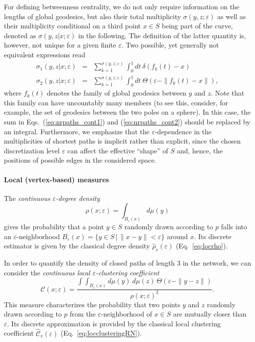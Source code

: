 For defining betweenness centrality, we do not only require information on the lengths of global geodesics, but also their total multiplicity $\sigma(y,z;\varepsilon)$ as well as their multiplicity conditional on a third point $x\in S$ being part of the curve, denoted as $\sigma(y,z|x;\varepsilon)$ in the following. The definition of the latter quantity is, however, not unique for a given finite $\varepsilon$. Two possible, yet generally not equivalent expressions read~\cite{Donges2012}
\begin{eqnarray}
\sigma_1(y,z|x;\varepsilon) &=& \sum_{k=1}^{\sigma(y,z;\varepsilon)} \int_0^1 dt\ \delta(f_k(t)-x) \label{eq:nrpaths_cont1} \\
\sigma_2(y,z|x;\varepsilon) &=& \sum_{k=1}^{\sigma(y,z;\varepsilon)} \int_0^1 dt\ \Theta(\varepsilon-\|f_k(t)-x\|), \label{eq:nrpaths_cont2}
\end{eqnarray}
\noindent
where $f_k(t)$ denotes the family of global geodesics between $y$ and $z$. Note that this family can have uncountably many members (to see this, consider, for example, the set of geodesics between the two poles on a sphere). In this case, the sum in Eqs.~(\ref{eq:nrpaths_cont1}) and (\ref{eq:nrpaths_cont2}) should be replaced by an integral. Furthermore, we emphasize that the $\varepsilon$-dependence in the multiplicities of shortest paths is implicit rather than explicit, since the chosen discretization level $\varepsilon$ can affect the effective ``shape'' of $S$ and, hence, the positions of possible edges in the considered space.


\paragraph{Local (vertex-based) measures}

The \emph{continuous $\varepsilon$-degree density}
\begin{equation}
\rho(x;\varepsilon)=\int_{B_{\varepsilon}(x)} d\mu(y)
\end{equation}
\noindent
gives the probability that a point $y\in S$ randomly drawn according to $p$ falls into an $\varepsilon$-neighborhood $B_{\varepsilon}(x)=\{y\in S\,|\, \|x-y\|<\varepsilon\}$ around $x$. Its discrete estimator is given by the classical degree density $\hat{\rho}_v(\varepsilon)$ (Eq.~\ref{eq:locrho}).

In order to quantify the density of closed paths of length 3 in the network, we can consider the \emph{continuous local $\varepsilon$-clustering coefficient}
\begin{equation}
\mathcal{C}(x;\varepsilon)=\frac{\int\int_{B_{\varepsilon}(x)} d\mu(y)\ d\mu(z)\ \Theta(\varepsilon-\|y-z\|)}{\rho(x;\varepsilon)^2}.
\end{equation}
\noindent
This measure characterizes the probability that two points $y$ and $z$ randomly drawn according to $p$ from the $\varepsilon$-neighborhood of $x\in S$ are mutually closer than $\varepsilon$. Its discrete approximation is provided by the classical local clustering coefficient $\hat{\mathcal{C}}_v(\varepsilon)$ (Eq.~\ref{eq:locclusteringRN}).

